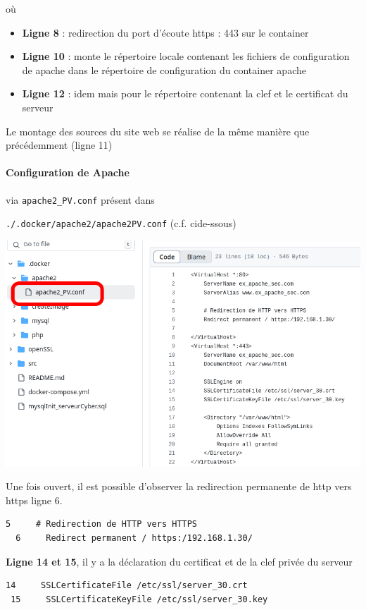\documentclass[french, 12pt]{article}%
\newcommand{\itemE}{\item[$\bullet$]}
\begin{document}
où 
\begin{itemize}
\itemE \textbf{Ligne 8} : redirection du port d'écoute https : 443 sur le container 
\itemE \textbf{Ligne 10} : monte le répertoire locale contenant les fichiers de configuration de apache dans le répertoire de configuration du container apache
\itemE \textbf{Ligne 12} : idem mais pour le répertoire contenant la clef et le certificat du serveur 
\end{itemize}

Le montage des sources du site web se réalise de la même manière que précédemment (ligne 11)

\paragraph{Configuration de Apache} via \verb?apache2_PV.conf? présent dans 

\verb?./.docker/apache2/apache2PV.conf? (c.f. cide-ssous)

\begin{center}
\includegraphics[scale=0.5]{./ressource/apacheGitHttpsConf}
\end{center}

Une fois ouvert, il est possible d'observer la redirection permanente de http vers https  ligne 6.
\begin{lstlisting}[style=commande]
  5     # Redirection de HTTP vers HTTPS
  6     Redirect permanent / https:/192.168.1.30/
\end{lstlisting}

\textbf{Ligne 14 et 15}, il y a la déclaration du certificat et de la clef privée du serveur 
\begin{lstlisting}[style=commande]
 14     SSLCertificateFile /etc/ssl/server_30.crt
 15     SSLCertificateKeyFile /etc/ssl/server_30.key
\end{lstlisting}
\end{document}
